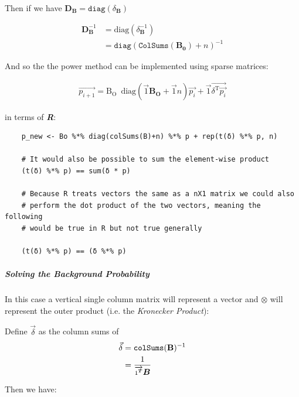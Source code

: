 \documentclass[11pt]{report}
\begin{document}
Then if we have \(\mathbf{D}_{\mathbf{B}} = \mathtt{diag}\left( \delta_{\mathbf{B}} \right)\)


   \begin{align}
	\mathbf{D}_{\mathbf{B}}^{-1} &= \mathrm{diag}\left( \delta_{\mathbf{B}}^{- 1} \right) \\
	&= \mathtt{diag} \left( \mathtt{ColSums \left( \mathbf{B_0} \right)} +  n \right)^{- 1}
\end{align}


And so the the power method can be implemented using sparse matrices:

\begin{align}
\vec{p_{i+1}} = \mathrm{B_{O}} \enspace \mathrm{diag}\left( \vec{1} \mathbf{B_{O}} + \vec{1}n \right) \vec{p_{i}} + \vec{1} \vec{\delta^{\mathrm{T}}\vec{p_{i}}}
\end{align}

in terms of \textbf{\emph{R}}:

\begin{tcolorbox}
    \begin{verbatim}
    p_new <- Bo %*% diag(colSums(B)+n) %*% p + rep(t(δ) %*% p, n)

    # It would also be possible to sum the element-wise product
    (t(δ) %*% p) == sum(δ * p)

    # Because R treats vectors the same as a nX1 matrix we could also
    # perform the dot product of the two vectors, meaning the following
    # would be true in R but not true generally

    (t(δ) %*% p) == (δ %*% p)
    \end{verbatim}
\end{tcolorbox}

\subparagraph{Solving the Background Probability}
\label{solve-background-prob-power-walk-sparse}
In this case a vertical single column matrix will represent a vector and \(\otimes\) will represent the outer product (i.e. the \emph{Kronecker Product}):



Define \(\vec{\delta}\) as the column sums of
\[\begin{aligned}
     \vec{\delta} & = \mathtt{colSums} (\text{{\bfseries{B}}})^{- 1}\\
     & = \frac{1}{\overrightarrow{1^{{\scriptsize \ensuremath{\boldsymbol{T}}}}}
     \ensuremath{\boldsymbol{B}}}
   \end{aligned}\]


Then we have:
\end{document}
